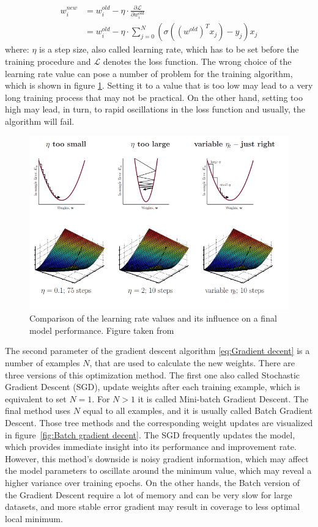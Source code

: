 \begin{align}
\label{eq:Gradient decent}
    w_{i}^{new} &= w_{i}^{old} - \eta \cdot \frac{\partial \mathcal{L}}{\partial w_{i}^{old}} \nonumber \\
    &= w_{i}^{old} - \eta  \cdot \sum_{j=0}^{N} \left( \sigma((w^{old})^{T}x_{j}) - y_{j} \right) x_j
\end{align}
where: $\eta$ is a step size, also called learning rate, which has to be set before the training procedure and $\mathcal{L}$ denotes the loss function. The wrong choice of the learning rate value can pose a number of problem for the training algorithm, which is shown in figure \ref{fig:Gradient decent}. Setting it to a value that is too low may lead to a very long training process that may not be practical. On the other hand, setting too high may lead, in turn, to rapid oscillations in the loss function and usually, the algorithm will fail.

\begin{figure}[!h]
\centering
\includegraphics{figures/LR_learning_rate.PNG}
\caption{Comparison of the learning rate values and its influence on a final model performance. Figure taken from \cite{abu-musafa}  
\label{fig:Gradient decent}}
\end{figure}
The second parameter of the gradient descent algorithm \ref{eq:Gradient decent} is a number of examples $N$, that are used to calculate the new weights. There are three versions of this optimization method. The first one also called Stochastic Gradient Descent (SGD), update weights after each training example, which is equivalent to set $N=1$. For $N>1$ it is called Mini-batch Gradient Descent. The final method uses $N$ equal to all examples, and it is usually called Batch Gradient Descent. Those tree methods and the corresponding weight updates are visualized in figure~\ref{fig:Batch gradient decent}. The SGD frequently updates the model, which provides immediate insight into its performance and improvement rate. However, this method's downside is noisy gradient information, which may affect the model parameters to oscillate around the minimum value, which may reveal a higher variance over training epochs. On the other hands, the Batch version of the Gradient Descent require a lot of memory and can be very slow for large datasets, and more stable error gradient may result in coverage to less optimal local minimum.

